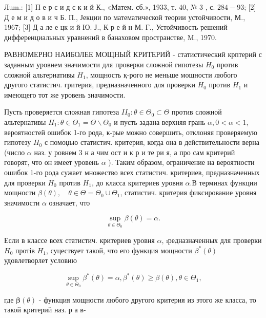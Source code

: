 \documentclass[10pt]{article}
\begin{document}
Лum.: [1] П е р с и д с к и й К., «Матем. сб.», 1933, т. 40, № 3 , с. $284-93$; [2] Д е м и д о в и ч Б. П., Јекции по математической теории устойчивости, М., 1967; [3] Д а ле е цк и й Ю. Ј., К р е й н М. Г., Устойчивость решений дифференциальных уравнений в банаховом пространстве, M., 1970.



РАВНОМЕРНО НАИБОЛЕЕ МОЩНЫЙ КРИТЕРИЙ - статистический крптерий с заданным уровнем значимости для проверки сложной гипотезы $H_{0}$ против сложной альтернативы $H_{1}$, мощность қ-рого не меньше мощности любого другого статистич. гритерия, предназначенного для проверки $H_{0}$ против $H_{1}$ и имеющего тот же уровень значимости.



Пусть проверяется сложная гипотеза $I I_{0}: \theta \in \Theta_{0} \subset \Theta$ против сложной альтернативы $H_{1}: \theta \in \Theta_{1}=\Theta \backslash \Theta_{0}$ и пусть задана верхняя грань $\alpha, 0<\alpha<1$, вероятностей ошибок 1-го рода, к-рые можно совершить, отклоняя проверяемую гипотезу $H_{0}$ с помоџью статистич. критерия, когда она в действительности верна (число $\alpha$ наз. у ровнем 3 н а чим ост и к р и те ри я, а про сам критерий говорят, что он имеет уровень $\alpha$ ). Таким образом, ограничение на вероятности ошибок 1-го рода сужает множество всех статистич. критериев, предназначенных для проверки $H_{0}$ против $H_{1}$, до класса критериев уровня $\alpha$.В терминах функции мощности $\beta(\theta), \quad \theta \in \Theta=\Theta_{0} \cup \Theta_{1}$, статистич. критерия фиксирование уровня значимости $\alpha$ означает, что



\[

\sup _{\theta \in \Theta_{0}} \beta(\theta)=\alpha .

\]



Если в классе всех статистич. критериев уровня $\alpha$, ıредназначенных для проверки $H_{0}$ протів $H_{1}$, суцествует такой, что его функция мощности $\beta^{*}(\theta)$ удовлетворлет условию



\[

\sup _{\theta \in \Theta_{0}} \beta^{*}(\theta)=\alpha, \beta^{*}(\theta) \geqslant \beta(\theta), \theta \in \Theta_{1},

\]



где $\boldsymbol{\beta}(\theta)$ - функция мощности любого другого критерия из этого же класса, то такой критерий наз. р а в-
\end{document}
